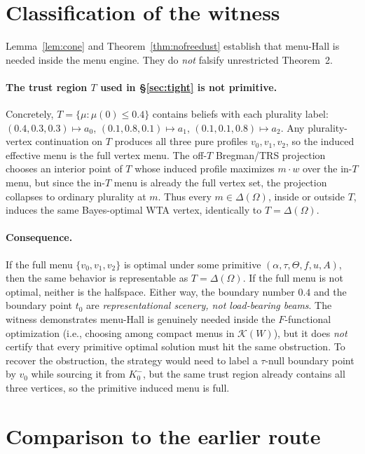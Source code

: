 \documentclass[11pt]{article}
\theoremstyle{definition}
\theoremstyle{remark}
\newcommand{\Om}{\Omega}
\begin{document}
\section{Classification of the witness}\label{sec:classification}

Lemma~\ref{lem:cone} and Theorem~\ref{thm:nofreedust} establish that
menu-Hall is needed inside the menu engine. They do \emph{not}
falsify unrestricted Theorem~2.

\paragraph{The trust region $T$ used in \S\ref{sec:tight} is not
primitive.} Concretely, $T = \{\mu : \mu(0)\le 0.4\}$ contains beliefs
with each plurality label: $(0.4, 0.3, 0.3)\mapsto a_0$, $(0.1, 0.8,
0.1)\mapsto a_1$, $(0.1, 0.1, 0.8)\mapsto a_2$. Any plurality-vertex
continuation on $T$ produces all three pure profiles $v_0, v_1, v_2$,
so the induced effective menu is the full vertex menu. The off-$T$
Bregman/TRS projection chooses an interior point of $T$ whose induced
profile maximizes $m\cdot w$ over the in-$T$ menu, but since the
in-$T$ menu is already the full vertex set, the projection collapses
to ordinary plurality at $m$. Thus every $m\in\Delta(\Om)$, inside or
outside $T$, induces the same Bayes-optimal WTA vertex, identically
to $T = \Delta(\Om)$.

\paragraph{Consequence.} If the full menu $\{v_0, v_1, v_2\}$ is
optimal under some primitive $(\alpha, \tau, \Theta, f, u, A)$, then
the same behavior is representable as $T = \Delta(\Om)$. If the full
menu is not optimal, neither is the halfspace. Either way, the
boundary number $0.4$ and the boundary point $t_0$ are
\emph{representational scenery, not load-bearing beams}. The witness
demonstrates menu-Hall is genuinely needed inside the
$F$-functional optimization (i.e., choosing among compact menus in
$\mathcal K(W)$), but it does \emph{not} certify that every primitive
optimal solution must hit the same obstruction. To recover the
obstruction, the strategy would need to label a $\tau$-null boundary
point by $v_0$ while sourcing it from $K_0^-$, but the same trust
region already contains all three vertices, so the primitive induced
menu is full.

\section{Comparison to the earlier route}\label{sec:comparison}
\end{document}
